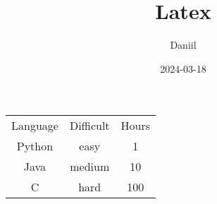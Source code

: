 \documentclass{article}
\title{Latex}
\author{Daniil}
\date{2024-03-18}
\begin{document}
\maketitle

\begin{tabular}{| c | c | c |}
\hline
Language & Difficult & Hours \\
Python & easy & 1 \\
Java & medium & 10 \\
C & hard & 100 \\
\hline
\end{tabular}
\end{document}
